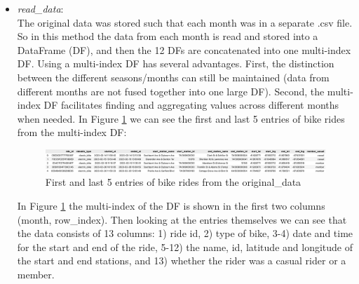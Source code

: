 \documentclass[12pt]{article}
\begin{document}
\begin{itemize}
	\item \textit{read\_data}:\\
	The original data was stored such that each month was in a separate .csv file. So in this method the data from each month is read and stored into a DataFrame (DF), and then the 12 DFs are concatenated into one multi-index DF. Using a multi-index DF has several advantages. First, the distinction between the different seasons/months can still be maintained (data from different months are not fused together into one large DF). Second, the multi-index DF facilitates finding and aggregating values across different months when needed. In Figure \ref{fig1} we can see the first and last 5 entries of bike rides from the multi-index DF:

	\begin{figure}[h]
	\hspace{0.5cm}
	\includegraphics[width=7.2 in, height = 3.3 in]{img1.png}
	\caption{First and last 5 entries of bike rides from the original\_data}
	\label{fig1}
	\end{figure}
	\pagebreak
	
	In Figure \ref{fig1} the multi-index of the DF is shown in the first two columns (month, row\_index). Then looking at the entries themselves we can see that the data consists of 13 columns: 1) ride id, 2) type of bike, 3-4) date and time for the start and end of the ride, 5-12) the name, id, latitude and longitude of the start and end stations, and 13) whether the rider was a casual rider or a member. 
	

\end{itemize}
\end{document}
